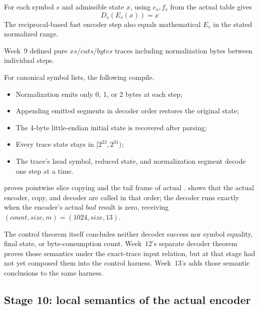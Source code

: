 \begin{verified}
For each symbol \(s\) and admissible state \(x\), using \(c_s,f_s\) from the
actual table gives
\[
  D_s(E_s(x))=x
\]
The reciprocal-based fast encoder step also equals mathematical \(E_s\)
in the stated normalized range.
\end{verified}

Week~9 defined pure \(xs/cuts/bytes\) traces including normalization bytes
between individual steps.

\begin{verified}
For canonical symbol lists, the following compile.
\begin{itemize}
  \item Normalization emits only 0, 1, or 2 bytes at each step;
  \item Appending emitted segments in decoder order restores the original state;
  \item The 4-byte little-endian initial state is recovered after parsing;
  \item Every trace state stays in \([2^{23},2^{31})\);
  \item The trace's head symbol, reduced state, and normalization segment
        decode one step at a time.
\end{itemize}
\end{verified}

\begin{verified}
 proves pointwise slice copying and
the tail frame of actual .
 shows that the
actual encoder, copy, and decoder are called in that order; the decoder runs
exactly when the encoder's actual \(bad\) result is zero, receiving
\((count,size,m)=(1024,\mathit{size},13)\).
\end{verified}

The control theorem itself concludes neither decoder success nor symbol
equality, final state, or byte-consumption count. Week~12's separate decoder
theorem proves those semantics under the exact-trace input relation, but at
that stage had not yet composed them into the control harness.
Week~13's  adds those
semantic conclusions to the same harness.

\subsection{Stage 10: local semantics of the actual encoder}

